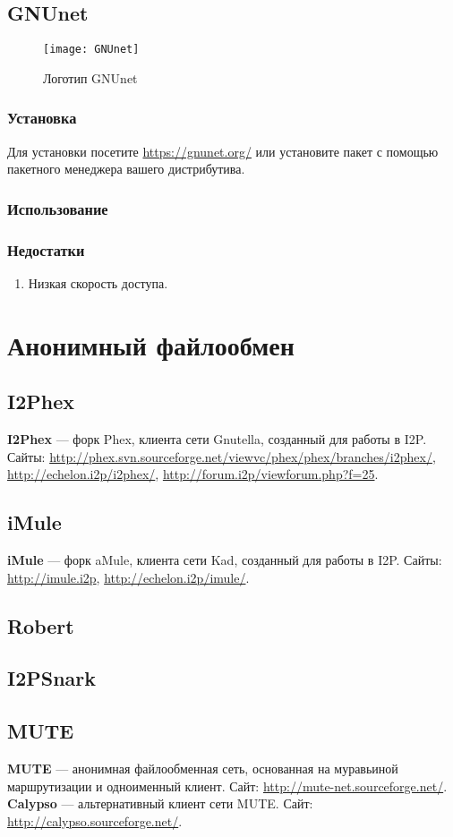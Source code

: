 \subsection{GNUnet}
\begin{wrapfigure}[9]{r}{0.25\linewidth}
\texttt{[image: GNUnet]}
\caption{Логотип GNUnet}
\end{wrapfigure}
\subsubsection{Установка}
Для установки посетите \url{https://gnunet.org/} или установите пакет с помощью пакетного менеджера вашего дистрибутива.
\subsubsection{Использование}
\subsubsection{Недостатки}
\begin{enumerate}
\item Низкая скорость доступа.
\end{enumerate}

\section{Анонимный файлообмен}
\subsection{I2Phex}
\textbf{I2Phex} --- форк Phex, клиента сети Gnutella, созданный для работы в I2P. Сайты: \url{http://phex.svn.sourceforge.net/viewvc/phex/phex/branches/i2phex/}, \url{http://echelon.i2p/i2phex/}, \url{http://forum.i2p/viewforum.php?f=25}.
\subsection{iMule}
\textbf{iMule} --- форк aMule, клиента сети Kad, созданный для работы в I2P. Сайты: \url{http://imule.i2p}, \url{http://echelon.i2p/imule/}.
\subsection{Robert}
\subsection{I2PSnark}
\subsection{MUTE}
\textbf{MUTE} --- анонимная файлообменная сеть, основанная на муравьиной маршрутизации и одноименный клиент. Сайт: \url{http://mute-net.sourceforge.net/}.\\
\textbf{Calypso} --- альтернативный клиент сети MUTE. Сайт: \url{http://calypso.sourceforge.net/}.
